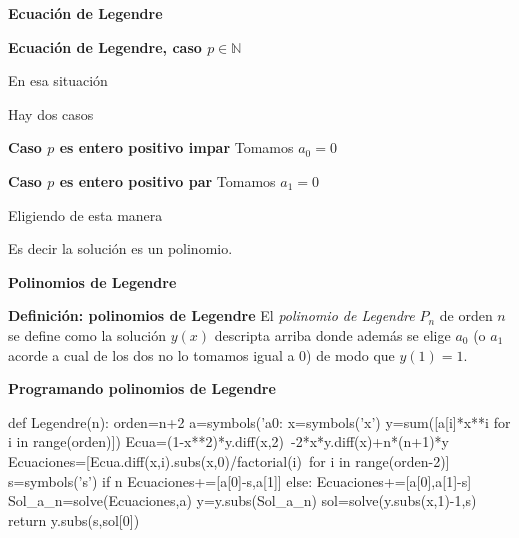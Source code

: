 \begin{frame}[fragile]{\textbf{Ecuación de Legendre}}
{\small
{}%
    {}
}

\end{frame}

\begin{frame}[fragile]{\textbf{Ecuación de Legendre, caso $p\in\mathbb{N}$ }}

 En esa situación
 
 
 Hay dos casos
 
 \textbf{Caso $p$ es entero positivo impar}  Tomamos $a_0=0$
  
  \textbf{Caso $p$ es entero positivo par}  Tomamos $a_1=0$
 
 Eligiendo de esta manera
 
 Es decir la solución es un polinomio.
 \end{frame}

\begin{frame}[fragile]{\textbf{Polinomios de Legendre}}
 \begin{block}{\textbf{Definición: polinomios de Legendre}}
  El \emph{polinomio de Legendre} $P_n$ de orden $n$ se define como la solución $y(x)$ descripta arriba donde además se elige $a_0$ (o $a_1$ acorde a cual de los dos no lo tomamos igual a 0) de modo que $y(1)=1$. 
 \end{block}
\end{frame}

\begin{frame}[fragile]{\textbf{Programando polinomios de Legendre }}

{\scriptsize
\begin{sympyblock}[][numbers=left,frame=single,framesep=5mm]
def Legendre(n):
    orden=n+2
    a=symbols('a0:%
    x=symbols('x')
    y=sum([a[i]*x**i for i in range(orden)])
    Ecua=(1-x**2)*y.diff(x,2)\
        -2*x*y.diff(x)+n*(n+1)*y
    Ecuaciones=[Ecua.diff(x,i).subs(x,0)/factorial(i)\
        for i in range(orden-2)]
    s=symbols('s')
    if n%
        Ecuaciones+=[a[0]-s,a[1]]
    else:
        Ecuaciones+=[a[0],a[1]-s]
    Sol_a_n=solve(Ecuaciones,a)
    y=y.subs(Sol_a_n)
    sol=solve(y.subs(x,1)-1,s)
    return y.subs(s,sol[0])
\end{sympyblock}
}


\end{frame}

